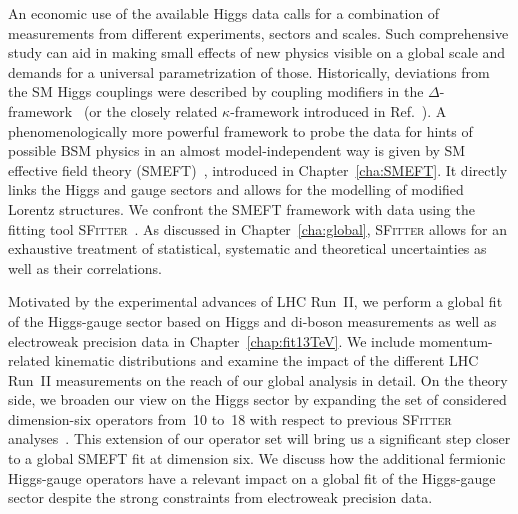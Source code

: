 An economic use of the available Higgs data calls for a combination of
measurements from different experiments, sectors 
and scales. Such comprehensive study can aid in making small effects of new physics 
visible on a global scale and demands for a universal parametrization of those. 
Historically, deviations from the SM Higgs couplings were described 
by coupling modifiers in the $\Delta$-framework~\cite{Lafaye:2009vr} (or the closely related 
$\kappa$-framework introduced in Ref.~\cite{LHCHiggsCrossSectionWorkingGroup:2012nn}). 
A phenomenologically more powerful framework to 
probe the data %
for hints of possible BSM physics 
in an almost model-independent way 
is given by SM effective field theory (SMEFT)~\cite{Weinberg:1978kz,Leung:1984ni,Buchmuller:1985jz,
GonzalezGarcia:1999fq,Grzadkowski:2010es,Passarino:2012cb}, 
introduced in Chapter~\ref{cha:SMEFT}.
It directly links the Higgs and gauge sectors and allows for the modelling of 
modified Lorentz structures. 
We confront the SMEFT framework with data using the fitting 
tool \textsc{SFitter}~\cite{Lafaye:2007vs}.
As discussed in Chapter~\ref{cha:global}, \textsc{SFitter} allows for an exhaustive treatment
of statistical, systematic and theoretical uncertainties as well as their correlations.

Motivated by the experimental advances of LHC Run~II, we perform a global fit of the Higgs-gauge sector 
based on Higgs and di-boson measurements as well as electroweak precision data in Chapter~\ref{chap:fit13TeV}. 
We include momentum-related kinematic distributions 
and examine the impact of the different LHC Run~II measurements on the reach of our 
global analysis in detail. 
On the theory side, we broaden our view on the Higgs sector by expanding 
the set of considered dimension-six operators from~10 to~18 with respect to 
previous \textsc{SFitter} analyses~\cite{Corbett:2015ksa,Butter:2016cvz}.
This extension of our operator set will bring 
us a significant step closer to a global SMEFT fit at dimension six.
We discuss how the additional fermionic Higgs-gauge operators have a relevant 
impact on a global fit of the Higgs-gauge sector
despite the strong constraints from electroweak precision data.

